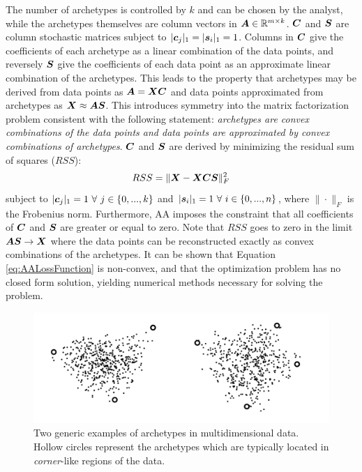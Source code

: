 The number of archetypes is controlled by $k$ and can be chosen by the analyst, while the archetypes themselves are column vectors in $\bm{A} \in \mathbb{R}^{m \times k}$. $\bm{C}$ and $\bm{S}$ are column stochastic matrices subject to $|\bm{c}_j|_1 = |\bm{s}_i|_1 = 1$. Columns in $\bm{C}$ give the coefficients of each archetype as a linear combination of the data points, and reversely $\bm{S}$ give the coefficients of each data point as an approximate linear combination of the archetypes. This leads to the property that archetypes may be derived from data points as $\bm{A} = \bm{XC}$ and data points approximated from archetypes as $\bm{X} \approx \bm{AS}$. This introduces symmetry into the matrix factorization problem consistent with the following statement: \textit{archetypes are convex combinations of the data points and data points are approximated by convex combinations of archetypes}. $\bm{C}$ and $\bm{S}$ are derived by minimizing the residual sum of squares ($RSS$):
\begin{equation}
	RSS = \|\bm{X} - \bm{XCS}\|_F^2
	\label{eq:AALossFunction}
\end{equation}
subject to $|\bm{c}_j|_1 = 1\,\, \forall \,\, j \in \{0, ..., k\}$ and $|\bm{s}_i|_1 = 1 \,\, \forall \,\, i \in \{0, ..., n\}$, where $\| \cdot \|_F$ is the Frobenius norm. Furthermore, AA imposes the constraint that all coefficients of $\bm{C}$ and $\bm{S}$ are greater or equal to zero. Note that $RSS$ goes to zero in the limit $\bm{AS} \rightarrow \bm{X}$ where the data points can be  reconstructed exactly as convex combinations of the archetypes. It can be shown that Equation \eqref{eq:AALossFunction} is non-convex, and that the optimization problem has no closed form solution, yielding numerical methods necessary for solving the problem.

\begin{figure}
	\centering
	\includegraphics[width=1\linewidth]{figures/AA}
	\caption{\label{fig:AA}Two generic examples of archetypes in multidimensional data. Hollow circles represent the archetypes which are typically located in \textit{corner}-like regions of the data.}
\end{figure}


